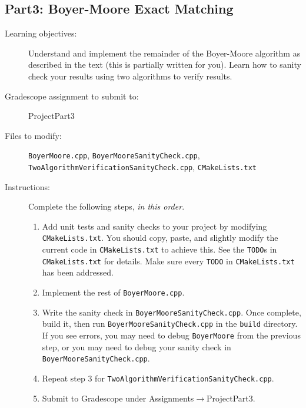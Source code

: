\documentclass[paper=a4, fontsize=11pt]{scrartcl} %
\numberwithin{equation}{section} %
\numberwithin{figure}{section} %
\numberwithin{table}{section} %
\begin{document}
\subsection*{Part3: Boyer-Moore Exact Matching}
\begin{description}
	\item[Learning objectives:] Understand and implement the remainder of the Boyer-Moore algorithm as described in the text (this is partially written for you). Learn how to sanity check your results using two algorithms to verify results.
	\item[Gradescope assignment to submit to:] ProjectPart3
	\item[Files to modify:] \texttt{BoyerMoore.cpp}, \texttt{BoyerMooreSanityCheck.cpp}, \texttt{TwoAlgorithmVerificationSanityCheck.cpp}, \texttt{CMakeLists.txt}
	\item[Instructions:] Complete the following steps, \textit{in this order}.
		\begin{enumerate}
			\item Add unit tests and sanity checks to your project by modifying \texttt{CMakeLists.txt}. You should copy, paste, and slightly modify the current code in \texttt{CMakeLists.txt} to achieve this. See the \texttt{TODO}s in \texttt{CMakeLists.txt} for details. Make sure every \texttt{TODO} in \texttt{CMakeLists.txt} has been addressed.
			\item Implement the rest of \texttt{BoyerMoore.cpp}.
			\item Write the sanity check in \texttt{BoyerMooreSanityCheck.cpp}. Once complete, build it, then run \texttt{BoyerMooreSanityCheck.cpp} in the \texttt{build} directory. If you see errors, you may need to debug \texttt{BoyerMoore} from the previous step, or you may need to debug your sanity check in \texttt{BoyerMooreSanityCheck.cpp}.
			\item Repeat step 3 for \texttt{TwoAlgorithmVerificationSanityCheck.cpp}.
			\item Submit to Gradescope under Assignments$\to$ProjectPart3.
		\end{enumerate}
\end{description}
\end{document}
